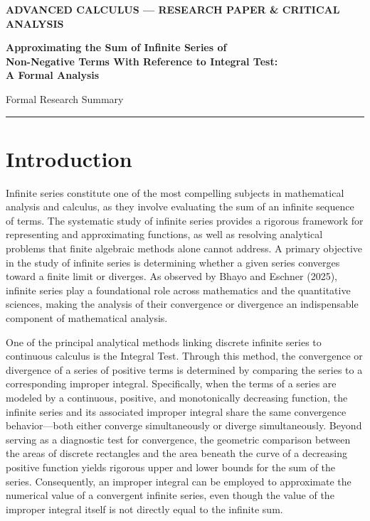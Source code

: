 \documentclass[11pt, a4paper]{article}
\begin{document}
\begin{center}
    {\small \textbf{ADVANCED CALCULUS --- RESEARCH PAPER \& CRITICAL ANALYSIS}} \\[0.4cm]
    {\LARGE \textbf{Approximating the Sum of Infinite Series of \\ Non-Negative Terms With Reference to Integral Test: \\ A Formal Analysis}\par}
    \vspace{0.4cm}
    {\large Formal Research Summary} \\[0.25cm]
    \rule{\textwidth}{0.8pt}
\end{center}

\vspace{0.2cm}

\section{Introduction}

Infinite series constitute one of the most compelling subjects in mathematical analysis and calculus, as they involve evaluating the sum of an infinite sequence of terms. The systematic study of infinite series provides a rigorous framework for representing and approximating functions, as well as resolving analytical problems that finite algebraic methods alone cannot address. A primary objective in the study of infinite series is determining whether a given series converges toward a finite limit or diverges. As observed by Bhayo and Eschner (2025), infinite series play a foundational role across mathematics and the quantitative sciences, making the analysis of their convergence or divergence an indispensable component of mathematical analysis.

One of the principal analytical methods linking discrete infinite series to continuous calculus is the Integral Test. Through this method, the convergence or divergence of a series of positive terms is determined by comparing the series to a corresponding improper integral. Specifically, when the terms of a series are modeled by a continuous, positive, and monotonically decreasing function, the infinite series and its associated improper integral share the same convergence behavior---both either converge simultaneously or diverge simultaneously. Beyond serving as a diagnostic test for convergence, the geometric comparison between the areas of discrete rectangles and the area beneath the curve of a decreasing positive function yields rigorous upper and lower bounds for the sum of the series. Consequently, an improper integral can be employed to approximate the numerical value of a convergent infinite series, even though the value of the improper integral itself is not directly equal to the infinite sum.
\end{document}
